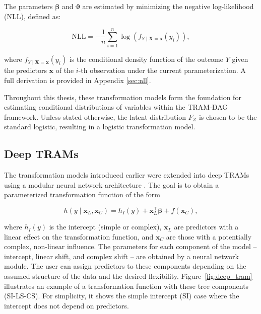 The parameters $\boldsymbol{\beta}$ and $\boldsymbol{\vartheta}$ are estimated by minimizing the negative log-likelihood (NLL), defined as:


\begin{equation}
\text{NLL} = - \frac{1}{n} \sum_{i=1}^{n} \log \left(f_{Y \mid \mathbf{X} = \mathbf{x}}(y_i)\right),
\label{eq:nll_tram}
\end{equation}

where $f_{Y \mid \mathbf{X} = \mathbf{x}}(y_i)$ is the conditional density function of the outcome $Y$ given the predictors $\mathbf{x}$ of the $i$-th observation under the current parameterization. A full derivation is provided in Appendix \ref{sec:nll}.

Throughout this thesis, these transformation models form the foundation for estimating conditional distributions of variables within the TRAM-DAG framework. Unless stated otherwise, the latent distribution $F_Z$ is chosen to be the standard logistic, resulting in a logistic transformation model.



\subsection{Deep TRAMs} \label{sec:deep_trams}

The transformation models introduced earlier were extended into deep TRAMs using a modular neural network architecture \citep{sick2020}. The goal is to obtain a parameterized transformation function of the form

\begin{equation}
h(y \mid \mathbf{x}_L, \mathbf{x}_C ) = h_I(y) + \mathbf{x}_L^\top \boldsymbol{\beta} + f(\mathbf{x}_C),
\label{eq:deep_tram_old}
\end{equation}

where $h_I(y)$ is the intercept (simple or complex), $\mathbf{x}_{L}$ are predictors with a linear effect on the transformation function, and $\mathbf{x}_{C}$ are those with a potentially complex, non-linear influence. The parameters for each component of the model -- intercept, linear shift, and complex shift -- are obtained by a neural network module. The user can assign predictors to these components depending on the assumed structure of the data and the desired flexibility. Figure~\ref{fig:deep_tram} illustrates an example of a transformation function with these tree components (SI-LS-CS). For simplicity, it shows the simple intercept (SI) case where the intercept does not depend on predictors.


